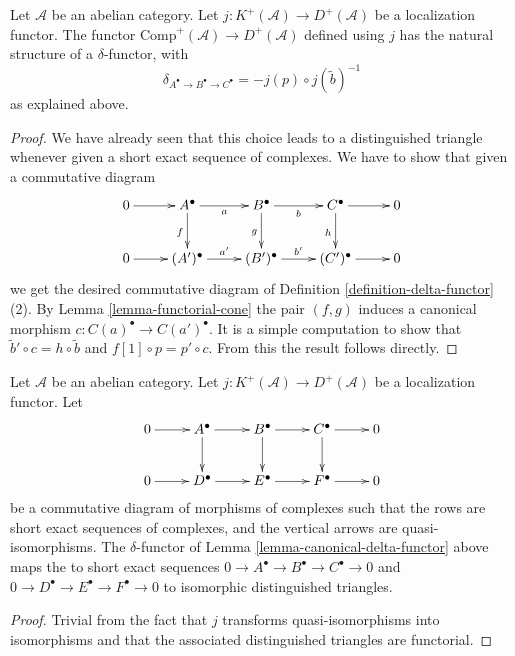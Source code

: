 \begin{lemma}
\label{lemma-canonical-delta-functor}
Let $\mathcal{A}$ be an abelian category.
Let $j : K^{+}(\mathcal{A}) \to D^{+}(\mathcal{A})$ be
a localization functor. The functor
$\text{Comp}^{+}(\mathcal{A}) \to D^{+}(\mathcal{A})$
defined using $j$ has the natural structure of a $\delta$-functor, with
$$
\delta_{A^\bullet \to B^\bullet \to C^\bullet} = -j(p) \circ j(\tilde b)^{-1}
$$
as explained above.
\end{lemma}

\begin{proof}
We have already seen that this choice leads to a distinguished
triangle whenever given a short exact sequence of complexes.
We have to show that given a commutative diagram
$$
\xymatrix{
0 \ar[r] &
A^\bullet \ar[r]_a \ar[d]_f &
B^\bullet \ar[r]_b \ar[d]_g &
C^\bullet \ar[r] \ar[d]_h &
0 \\
0 \ar[r] &
(A')^\bullet \ar[r]^{a'} &
(B')^\bullet \ar[r]^{b'} &
(C')^\bullet \ar[r] &
0
}
$$
we get the desired commutative diagram of
Definition \ref{definition-delta-functor} (2).
By Lemma \ref{lemma-functorial-cone}
the pair $(f, g)$ induces a canonical morphism
$c : C(a)^\bullet \to C(a')^\bullet$. It is a simple computation
to show that $\tilde b' \circ c = h \circ \tilde b$ and
$f[1] \circ p = p' \circ c$. From this the result follows directly.
\end{proof}

\begin{lemma}
\label{lemma-compare-triangles-ses}
Let $\mathcal{A}$ be an abelian category.
Let $j : K^{+}(\mathcal{A}) \to D^{+}(\mathcal{A})$ be
a localization functor.
Let
$$
\xymatrix{
0 \ar[r] &
A^\bullet \ar[r] \ar[d] &
B^\bullet \ar[r] \ar[d] &
C^\bullet \ar[r] \ar[d] &
0 \\
0 \ar[r] &
D^\bullet \ar[r] &
E^\bullet \ar[r] &
F^\bullet \ar[r] &
0
}
$$
be a commutative diagram of morphisms of complexes
such that the rows are short exact sequences of complexes, and
the vertical arrows are quasi-isomorphisms.
The $\delta$-functor of Lemma \ref{lemma-canonical-delta-functor} above
maps the to short exact sequences
$0 \to A^\bullet \to B^\bullet \to C^\bullet \to 0$
and
$0 \to D^\bullet \to E^\bullet \to F^\bullet \to 0$
to isomorphic distinguished triangles.
\end{lemma}

\begin{proof}
Trivial from the fact that $j$ transforms quasi-isomorphisms
into isomorphisms and that the associated distinguished
triangles are functorial.
\end{proof}

